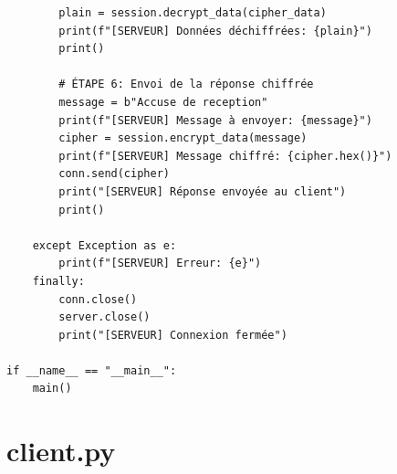 \documentclass[12pt,a4paper]{report}
\begin{document}
\begin{verbatim}
        plain = session.decrypt_data(cipher_data)
        print(f"[SERVEUR] Données déchiffrées: {plain}")
        print()
        
        # ÉTAPE 6: Envoi de la réponse chiffrée
        message = b"Accuse de reception"
        print(f"[SERVEUR] Message à envoyer: {message}")
        cipher = session.encrypt_data(message)
        print(f"[SERVEUR] Message chiffré: {cipher.hex()}")
        conn.send(cipher)
        print("[SERVEUR] Réponse envoyée au client")
        print()
        
    except Exception as e:
        print(f"[SERVEUR] Erreur: {e}")
    finally:
        conn.close()
        server.close()
        print("[SERVEUR] Connexion fermée")

if __name__ == "__main__":
    main()
\end{verbatim}

\section{client.py}
\end{document}
